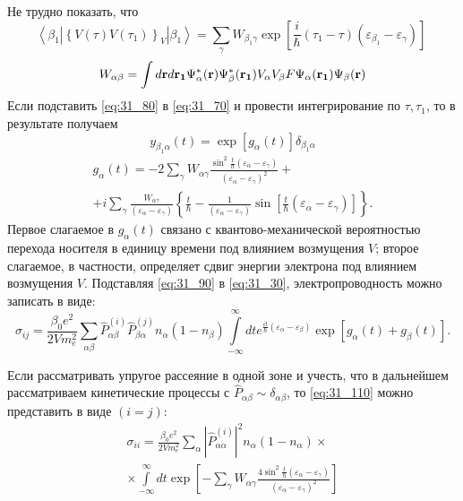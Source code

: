 \noindent Не трудно показать, что
\begin{equation} \label{eq:31_80}
\left\langle {\beta }_1\left|{\left\{V\left(\tau \right)V\left({\tau }_1\right)\right\}}_V\right|{\beta }_1\right\rangle =\sum_{\gamma }{W_{{\beta }_1\gamma }\exp \left[\frac{i}{\hbar }\left({\tau }_1-\tau \right)\left({\varepsilon }_{{\beta }_1}-{\varepsilon }_{\gamma }\right)\right]\ }
\end{equation}
\begin{equation} \label{eq:31_85}
W_{\alpha\beta}=\int{d\boldsymbol{\mathbf{r}} d\boldsymbol{\mathbf{r_1}} \Psi^*_\alpha(\boldsymbol{\mathbf{r}}) \Psi^*_\beta(\boldsymbol{\mathbf{r_1}}) V_\alpha V_\beta F \Psi_\alpha(\boldsymbol{\mathbf{r_1}}) \Psi_\beta(\boldsymbol{\mathbf{r}})}
\end{equation}
Если подставить \eqref{eq:31_80} в \eqref{eq:31_70} и провести интегрирование по $\tau ,{\tau }_1$, то в результате получаем
\begin{equation} \label{eq:31_90}
y_{{\beta }_1\alpha}(t)=\exp [g_{\alpha }\left(t\right)]{\delta }_{{\beta }_1\alpha}
\end{equation}
\begin{multline} \label{eq:31_100}
g_{\alpha}(t)=-2\sum_{\gamma}{W_{\alpha \gamma }\frac{{\sin}^2 \frac{t}{\hbar } (\varepsilon_{\alpha} - \varepsilon_{\gamma})}{{(\varepsilon_{\alpha} - \varepsilon_{\gamma})}^2}}+\\
+i\sum_{\gamma }{\frac{W_{\alpha \gamma}}{(\varepsilon_{\alpha} - \varepsilon_{\gamma})}}\left\{\frac{t}{\hbar }-\frac{1}{(\varepsilon_{\alpha} - \varepsilon_{\gamma})}{\sin\left[ \frac{t}{\hbar }(\varepsilon_{\alpha } - \varepsilon_{\gamma})\right] }\right\}.	
\end{multline}
Первое слагаемое в $g_{\alpha }\left(t\right)$ связано с квантово-механической вероятностью перехода носителя в единицу времени под влиянием возмущения $V$; второе слагаемое, в частности, определяет сдвиг энергии электрона под влиянием возмущения $V$.
Подставляя \eqref{eq:31_90} в \eqref{eq:31_30}, электропроводность можно записать в виде:
\begin{equation} \label{eq:31_110}
{\sigma }_{ij}=\frac{{\beta }_0e^2}{2Vm^2_e}\sum_{\alpha \beta }{{\hat{P}}^{\left(i\right)}_{\alpha \beta }{\hat{P}}^{\left(j\right)}_{\beta \alpha }n_{\alpha }\left(1-n_{\beta }\right)}\int\limits_{-\infty }^\infty{dt e^{\frac{it}{\hbar }({\varepsilon }_{\alpha }-{\varepsilon }_{\beta })}\exp [g_{\alpha }(t)+g_{\beta }(t)]}.
\end{equation} 

Если рассматривать упругое рассеяние в одной зоне и учесть, что в дальнейшем рассматриваем кинетические процессы с ${\hat{P}}_{\alpha \beta }\sim {\delta }_{\alpha \beta }$, то \eqref{eq:31_110} можно представить в виде $(i=j)$:
\begin{multline} \label{eq:31_120}
{\sigma }_{ii}=\frac{{\beta }_0e^2}{2Vm^2_e}\sum_{\alpha }{{\left|{\hat{P}}^{(i)}_{\alpha \alpha }\right|}^2 n_{\alpha }\left(1-n_{\alpha }\right)}\times\\
\times\int\limits_{- \infty }^\infty {dt \exp \left[-\sum_{\gamma }{W_{\alpha \gamma }\frac{4 \sin^2 \frac{t}{\hbar}\left({\varepsilon }_{\alpha }-{\varepsilon }_{\gamma }\right)}{(\varepsilon_{\alpha } - \varepsilon_{\gamma })^2}}\right]}
\end{multline}

